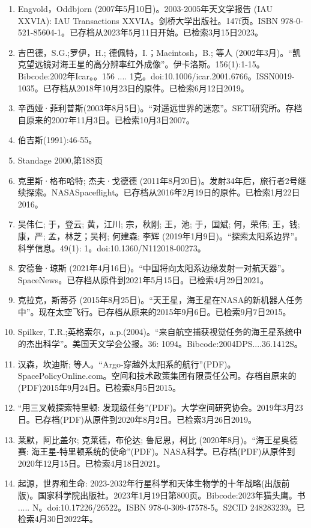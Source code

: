 \begin{enumerate}
\item Engvold，Oddbjorn (2007年5月10日)。2003-2005年天文学报告 (IAU XXVIA): IAU Transactions XXVIA。剑桥大学出版社。147f页。ISBN 978-0-521-85604-1。已存档从2023年5月11日开始。已检索3月15日2023。
\item 吉巴德，S.G.;罗伊，H.; 德佩特，I.；Macintosh，B.; 等人 (2002年3月)。“凯克望远镜对海王星的高分辨率红外成像”。伊卡洛斯。156(1):1-15。Bibcode:2002年Icar。。156 .... 1克。doi:10.1006/icar.2001.6766。ISSN0019-1035。已存档从2018年10月23日的原件。已检索6月12日2019。 
\item 辛西娅·菲利普斯(2003年8月5日)。“对遥远世界的迷恋”。SETI研究所。存档自原来的2007年11月3日。已检索10月3日2007。
\item 伯吉斯(1991):46-55。
\item Standage 2000,第188页
\item 克里斯·格布哈特; 杰夫·戈德德 (2011年8月20日)。发射34年后，旅行者2号继续探索。NASASpaceflight。已存档从2016年2月19日的原件。已检索1月22日2016。
\item 吴伟仁; 于，登云; 黄，江川; 宗，秋刚; 王，池; 于，国斌; 何，荣伟; 王，钱; 康，严; 孟，林芝；吴柯; 何建森; 李辉 (2019年1月9日)。“探索太阳系边界”。科学信息。49(1): 1。doi:10.1360/N112018-00273。
\item 安德鲁·琼斯 (2021年4月16日)。“中国将向太阳系边缘发射一对航天器”。SpaceNews。已存档从原件到2021年5月15日。已检索4月29日2021。
\item 克拉克，斯蒂芬 (2015年8月25日)。“天王星，海王星在NASA的新机器人任务中”。现在太空飞行。已存档从原来的2015年9月6日。已检索9月7日2015。
\item Spilker, T.R.;英格索尔，a.p.(2004)。“来自航空捕获视觉任务的海王星系统中的杰出科学”。美国天文学会公报。36: 1094。Bibcode:2004DPS....36.1412S。
\item 汉森，坎迪斯; 等人。“Argo-穿越外太阳系的航行”(PDF)。SpacePolicyOnline.com。空间和技术政策集团有限责任公司。存档自原来的(PDF)2015年9月24日。已检索8月5日2015。
\item “用三叉戟探索特里顿: 发现级任务”(PDF)。大学空间研究协会。2019年3月23日。已存档(PDF)从原件到2020年8月2日。已检索3月26日2019。
\item 莱默，阿比盖尔; 克莱德，布伦达; 鲁尼恩，柯比 (2020年8月)。“海王星奥德赛: 海王星-特里顿系统的使命”(PDF)。NASA科学。已存档(PDF)从原件到2020年12月15日。已检索4月18日2021。
\item 起源，世界和生命: 2023-2032年行星科学和天体生物学的十年战略(出版前版)。国家科学院出版社。2023年1月19日第800页。Bibcode:2023年猫头鹰。书 ..... N。doi:10.17226/26522。ISBN 978-0-309-47578-5。S2CID 248283239。已检索4月30日2022年。

\end{enumerate}

